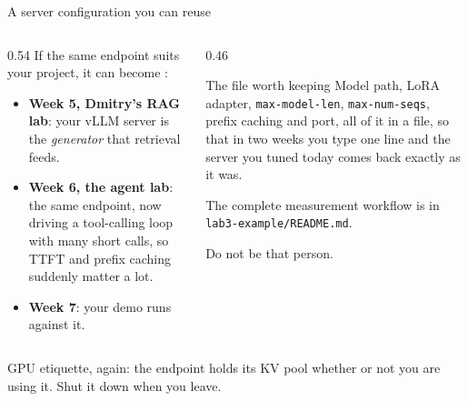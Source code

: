 \documentclass[aspectratio=169,10pt]{beamer}
\begin{document}
\begin{frame}{A server configuration you can reuse}
  \begin{columns}[T]
    \begin{column}{0.54\textwidth}
      If the same endpoint suits your project, it can become
      :
      \vspace{0.4em}
      \begin{itemize}\small
        \item \textbf{Week 5, Dmitry's RAG lab}: your vLLM server is the
          \emph{generator} that retrieval feeds.
        \item \textbf{Week 6, the agent lab}: the same endpoint, now driving
          a tool-calling loop with many short calls, so TTFT and prefix caching
          suddenly matter a lot.
        \item \textbf{Week 7}: your demo runs against it.
      \end{itemize}
    \end{column}
    \begin{column}{0.46\textwidth}
      \begin{block}{The file worth keeping}
        \small
        \vspace{0.3em}
        Model path, LoRA adapter, \texttt{max-model-len},
        \texttt{max-num-seqs}, prefix caching and port, all of it in a file,
        so that in two weeks you type one line and the server you tuned today
        comes back exactly as it was.
      \end{block}
      \vspace{0.2em}
      \small
      The complete measurement workflow is in
      \texttt{lab3-example/README.md}.

       Do not be that person.
    \end{column}
  \end{columns}
  \vfill
  \centering
  \small
  GPU etiquette, again: the endpoint holds its KV pool whether or not you are
  using it. Shut it down when you leave.
\end{frame}
\end{document}
